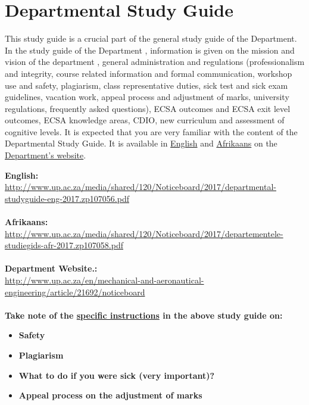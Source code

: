 \section{Departmental Study Guide} \label{sec:dep_study_guide}
    This study guide is a crucial part of the general study guide of the
    Department. In the study guide of the Department , information is given on
    the mission and vision of the department , general administration and
    regulations (professionalism and integrity, course related information and
    formal communication, workshop use and safety, plagiarism, class
    representative duties, sick test and sick exam guidelines, vacation work,
    appeal process and adjustment of marks, university regulations, frequently
    asked questions), ECSA outcomes and ECSA exit level outcomes, ECSA
    knowledge areas, CDIO, new curriculum and assessment of cognitive levels.
    It is expected that you are very familiar with the content of the
    Departmental Study Guide. It is available in
    \href{http://www.up.ac.za/media/shared/120/Noticeboard/2017/departmental-studyguide-eng-2017.zp107056.pdf}{English}
    and
    \href{http://www.up.ac.za/media/shared/120/Noticeboard/2017/departementele-studiegids-afr-2017.zp107058.pdf}{Afrikaans}
    on the
    \href{http://www.up.ac.za/en/mechanical-and-aeronautical-engineering/article/21692/noticeboard}{Department’s website}.

    \noindent
    \textbf{English:} \\
    \url{http://www.up.ac.za/media/shared/120/Noticeboard/2017/departmental-studyguide-eng-2017.zp107056.pdf} \\~\\
    \textbf{Afrikaans:} \\
    \url{http://www.up.ac.za/media/shared/120/Noticeboard/2017/departementele-studiegids-afr-2017.zp107058.pdf} \\~\\
    \textbf{Department Website.:} \\
    \url{http://www.up.ac.za/en/mechanical-and-aeronautical-engineering/article/21692/noticeboard} \\~\\

    \noindent
    \textbf{Take note of the \uline{specific instructions} in the above study guide on:}
    \begin{itemize}
        \item \textbf{Safety}
        \item \textbf{Plagiarism}
        \item \textbf{What to do if you were sick (very important)?}
        \item \textbf{Appeal process on the adjustment of marks}
    \end{itemize}

